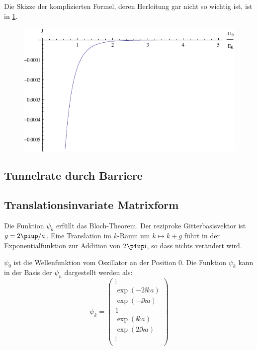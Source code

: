 Die Skizze der komplizierten Formel, deren Herleitung gar nicht so wichtig ist,
ist in \cref{fig:J}.

\begin{figure}
	\centering
	\includegraphics[width=\linewidth]{3d.pdf}
	\caption{}
	\label{fig:J}
\end{figure}

\subsection{Tunnelrate durch Barriere}

\fehlt

\subsection{Translationsinvariate Matrixform}

Die Funktion $\psi_k$ erfüllt das Bloch-Theorem. Der reziproke
Gitterbasisvektor ist $g = 2\piup/a$. Eine Translation im $k$-Raum um $k
\mapsto k + g$ führt in der Exponentialfunktion zur Addition von $2\piup \ii$,
so dass nichts verändert wird.

$\psi_0$ ist die Wellenfunktion vom Oszillator an der Position 0. Die Funktion $\psi_k$ kann in der Basis der $\psi_n$ dargestellt werden als:
\[
	\psi_k =
	\begin{pmatrix}
		\vdots \\
		\exp(-2 \ii k a) \\
		\exp(- \ii k a) \\
		1 \\
		\exp(\ii k a) \\
		\exp(2 \ii k a) \\
		\vdots \\
	\end{pmatrix}
\]

